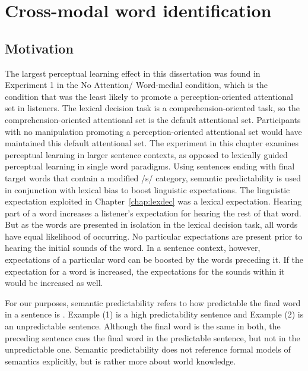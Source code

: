 
\chapter{Cross-modal word identification}
\label{chap:sent}


\section{Motivation}

The largest perceptual learning effect in this dissertation was found in Experiment 1 in the No Attention/ Word-medial condition, which is the condition that was the least likely to promote a perception-oriented attentional set in listeners.
The lexical decision task is a comprehension-oriented task, so the comprehension-oriented attentional set is the default attentional set.
Participants with no manipulation promoting a perception-oriented attentional set would have maintained this default attentional set.
The experiment in this chapter examines perceptual learning in larger sentence contexts, as opposed to lexically guided perceptual learning in single word paradigms.
Using sentences ending with final target words that contain a modified /s/ category, semantic predictability is used in conjunction with lexical bias to boost linguistic expectations.
The linguistic expectation exploited in Chapter~\ref{chap:lexdec} was a lexical expectation.
Hearing part of a word increases a listener's expectation for hearing the rest of that word.
But as the words are presented in isolation in the lexical decision task, all words have equal likelihood of occurring.
No particular expectations are present prior to hearing the initial sounds of the word.
In a sentence context, however, expectations of a particular word can be boosted by the words preceding it.
If the expectation for a word is increased, the expectations for the sounds within it would be increased as well.


For our purposes, semantic predictability refers to how predictable the final word in a sentence is \citep{Kalikow1977}.
Example (1) is a high predictability sentence and Example (2) is an unpredictable sentence.
Although the final word is the same in both, the preceding sentence cues the final word in the predictable sentence, but not in the unpredictable one.
Semantic predictability does not reference formal models of semantics explicitly, but is rather more about world knowledge.

